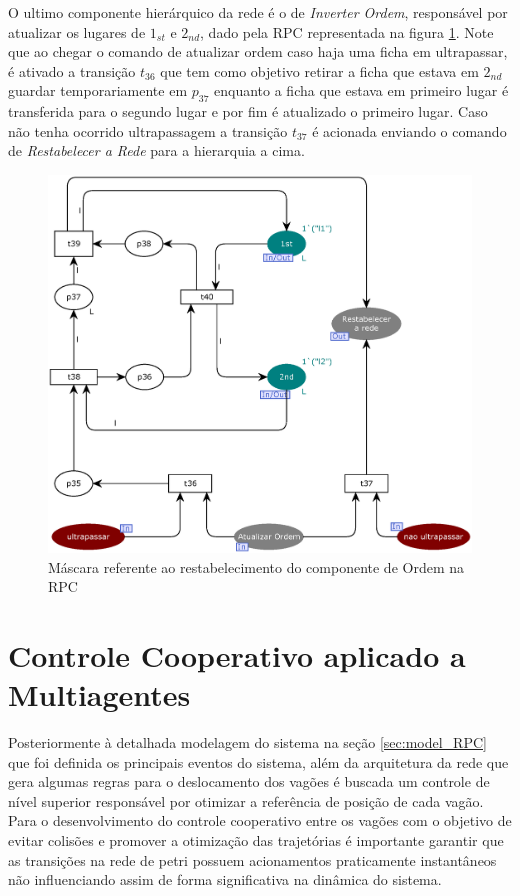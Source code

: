 O ultimo componente hierárquico da rede é o de \textit{Inverter Ordem}, responsável por atualizar os lugares de $1_{st}$ e $2_{nd}$, dado pela RPC representada na figura \ref{fig:inverter_ordem}. Note que ao chegar o comando de atualizar ordem caso haja uma ficha em ultrapassar, é ativado a transição $t_{36}$ que tem como objetivo retirar a ficha que estava em $2_{nd}$ guardar temporariamente em $p_{37}$ enquanto a ficha que estava em primeiro lugar é transferida para o segundo lugar e por fim é atualizado o primeiro lugar.
Caso não tenha ocorrido ultrapassagem a transição $t_{37}$ é acionada enviando o comando de \textit{Restabelecer a Rede} para a hierarquia a cima.

\begin{figure}[ht]
    \centering
    \caption{Máscara referente ao restabelecimento do componente de Ordem na RPC}
    \label{fig:inverter_ordem}
    \includegraphics[width=1\linewidth]{figures/Simulation/Modelagem/inverter_ordem.eps}
\end{figure}

\section{Controle Cooperativo aplicado a Multiagentes}
Posteriormente à detalhada modelagem do sistema na seção \ref{sec:model_RPC} que foi definida os principais eventos do sistema, além da arquitetura da rede que gera algumas regras para o deslocamento dos vagões é buscada um controle de nível superior responsável por otimizar a referência de posição de cada vagão. Para o desenvolvimento do controle cooperativo entre os vagões com o objetivo de evitar   colisões e promover a otimização das trajetórias é importante garantir que as transições na rede de petri possuem acionamentos praticamente instantâneos não influenciando assim de forma significativa na dinâmica do sistema.

